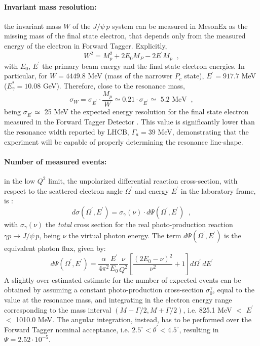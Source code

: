\documentclass[a4paper,10pt]{article}
\begin{document}
\paragraph{Invariant mass resolution: } the invariant mass $W$ of the $J/\psi\, p$ system can be measured in MesonEx as the missing mass of the final state electron, that depends only from the measured energy of the electron in Forward Tagger. Explicitly,
\begin{equation}
W^2=M_p^2+2E_0M_P-2E^{\prime}M_p \; \; ,
\end{equation}
with $E_0$, $E^{\prime}$ the primary beam energy and the final state electron energies. In particular, for $W=4449.8$ MeV (mass of the narrower $P_c$ state), $E^{\prime}=917.7$ MeV ($E^*_{\gamma}=10.08$ GeV). Therefore, close to the resonance mass,
\begin{equation}
\sigma_W=\sigma_{E^{\prime}} \cdot \frac{M_p}{W} \simeq 0.21 \cdot \sigma_{E^{\prime}} \simeq \mbox{ 5.2 MeV}\; \; ,
\end{equation}  
being $\sigma_{E^{\prime}} \simeq$ 25 MeV the expected energy resolution for the final state electron measured in the Forward Tagger Detector \cite{Celentano:2014boa}. This value is significantly lower than the resonance width reported by LHCB, $\Gamma_a=39$ MeV, demonstrating that the experiment will be capable of properly determining the resonance line-shape.
\paragraph{Number of measured events: } in the low $Q^{2}$ limit, the unpolarized differential reaction cross-section, with respect to the scattered electron angle $\Omega^{\prime}$ and energy $E^{\prime}$ in the laboratory frame, is \cite{Budnev:1974de}:
\begin{equation}
d\sigma(\Omega^{\prime},E^{\prime}) = \sigma_\gamma(\nu) \cdot d \Psi(\Omega^{\prime},E^{\prime}) \; \; ,
\end{equation}
with $\sigma_\gamma(\nu)$ the \textit{total} cross section for the real photo-production reaction $\gamma p \rightarrow J/\psi\, p$, being $\nu$ the virtual photon energy. The term $d \Psi(\Omega^{\prime},E^{\prime})$ is the equivalent photon flux, given by:
\begin{equation}
d\Psi(\Omega^{\prime},E^{\prime})=\frac{\alpha}{4\pi^{2}}\frac{E^{\prime}}{E_0}\frac{\nu}{Q^2}\left[\frac{(2E_0-\nu)^2}{\nu^2}+1  \right] d\Omega^{\prime} \,d E^{\prime}
\end{equation}
A slightly over-estimated estimate for the number of expected events can be obtained by assuming a constant photo-production cross-section $\sigma^{\gamma}_0$, equal to the value at the resonance mass, and integrating in the electron energy range corresponding to the mass interval $(M-\Gamma/2,M+\Gamma/2)$, i.e. 825.1 MeV $<$ $E^{\prime}$ $<$ 1010.0 MeV. The angular integration, instead, has to be performed over the Forward Tagger nominal acceptance, i.e. $2.5^{\circ}<\theta^{\prime}<4.5^{\circ}$, resulting in $\Psi=2.52\cdot 10^{-5}$.
\end{document}
